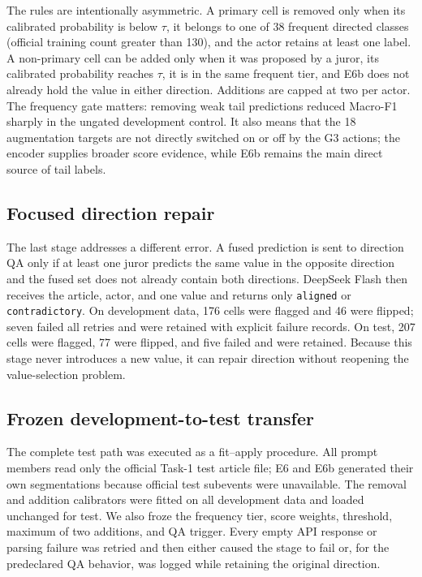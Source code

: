 \documentclass[sigconf,article,a4paper]{acmart}
\begin{document}
The rules are intentionally asymmetric. A primary cell is removed only when
its calibrated probability is below $\tau$, it belongs to one of 38 frequent
directed classes (official training count greater than 130), and the actor
retains at least one label. A non-primary cell can be added only when it was
proposed by a juror, its calibrated probability reaches $\tau$, it is in the
same frequent tier, and E6b does not already hold the value in either direction.
Additions are capped at two per actor. The frequency gate matters: removing
weak tail predictions reduced Macro-F1 sharply in the ungated development
control. It also means that the 18 augmentation targets are not directly
switched on or off by the G3 actions; the encoder supplies broader score
evidence, while E6b remains the main direct source of tail labels.

\subsection{Focused direction repair}

The last stage addresses a different error. A fused prediction is sent to
direction QA only if at least one juror predicts the same value in the opposite
direction and the fused set does not already contain both directions. DeepSeek
Flash then receives the article, actor, and one value and returns only
\texttt{aligned} or \texttt{contradictory}. On development data, 176 cells were
flagged and 46 were flipped; seven failed all retries and were retained with
explicit failure records. On test, 207 cells were flagged, 77 were flipped,
and five failed and were retained. Because this stage never introduces a new
value, it can repair direction without reopening the value-selection problem.

\subsection{Frozen development-to-test transfer}

The complete test path was executed as a fit--apply procedure. All prompt
members read only the official Task-1 test article file; E6 and E6b generated
their own segmentations because official test subevents were unavailable. The
removal and addition calibrators were fitted on all development data and loaded
unchanged for test. We also froze the frequency tier, score weights, threshold,
maximum of two additions, and QA trigger. Every empty
API response or parsing failure was retried and then either caused the stage to
fail or, for the predeclared QA behavior, was logged while retaining the
original direction.
\end{document}
